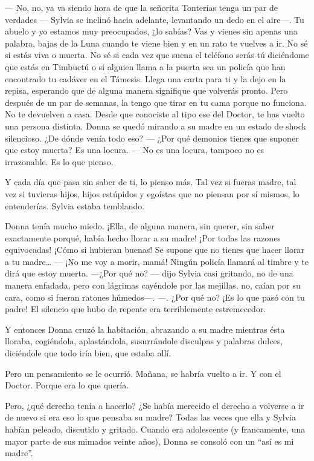 --- No, no, ya va siendo hora de que la señorita Tonterías tenga un par
de verdades --- Sylvia se inclinó hacia adelante, levantando un dedo en
el aire---. Tu abuelo y yo estamos muy preocupados, ¿lo sabías? Vas y
vienes sin apenas una palabra, bajas de la Luna cuando te viene bien y
en un rato te vuelves a ir. No sé si estás viva o muerta. No sé si cada
vez que suena el teléfono serás tú diciéndome que estás en Timbuctú o si
alguien llama a la puerta sea un policía que han encontrado tu cadáver
en el Támesis. Llega una carta para ti y la dejo en la repisa, esperando
que de alguna manera signifique que volverás pronto. Pero después de un
par de semanas, la tengo que tirar en tu cama porque no funciona. No te
devuelven a casa. Desde que conociste al tipo ese del Doctor, te has
vuelto una persona distinta. Donna se quedó mirando a su madre en un
estado de shock silencioso. ¿De dónde venía todo eso? --- ¿Por qué
demonios tienes que suponer que estoy muerta? Es una locura. --- No es
una locura, tampoco no es irrazonable. Es lo que pienso.

Y cada día que pasa sin saber de ti, lo pienso más. Tal vez si fueras
madre, tal vez si tuvieras hijos, hijos estúpidos y egoístas que no
piensan por sí mismos, lo entenderías. Sylvia estaba temblando.

Donna tenía mucho miedo. ¡Ella, de alguna manera, sin querer, sin saber
exactamente porqué, había hecho llorar a su madre! ¡Por todas las
razones equivocadas! ¡Cómo si hubieran buenas! Se supone que no tienes
que hacer llorar a tu madre\ldots{} --- ¡No me voy a morir, mamá! Ningún
policía llamará al timbre y te dirá que estoy muerta. ---¿Por qué no?
--- dijo Sylvia casi gritando, no de una manera enfadada, pero con
lágrimas cayéndole por las mejillas, no, caían por su cara, como si
fueran ratones húmedos---. ---. ¿Por qué no? ¡Es lo que pasó con tu
padre! El silencio que hubo de repente era terriblemente estremecedor.

Y entonces Donna cruzó la habitación, abrazando a su madre mientras ésta
lloraba, cogiéndola, aplastándola, susurrándole disculpas y palabras
dulces, diciéndole que todo iría bien, que estaba allí.

Pero un pensamiento se le ocurrió. Mañana, se habría vuelto a ir. Y con
el Doctor. Porque era lo que quería.

Pero, ¿qué derecho tenía a hacerlo? ¿Se había merecido el derecho a
volverse a ir de nuevo si era eso lo que pensaba su madre? Todas las
veces que ella y Sylvia habían peleado, discutido y gritado. Cuando era
adolescente (y francamente, una mayor parte de sus mimados veinte años),
Donna se consoló con un ``así es mi madre''.

